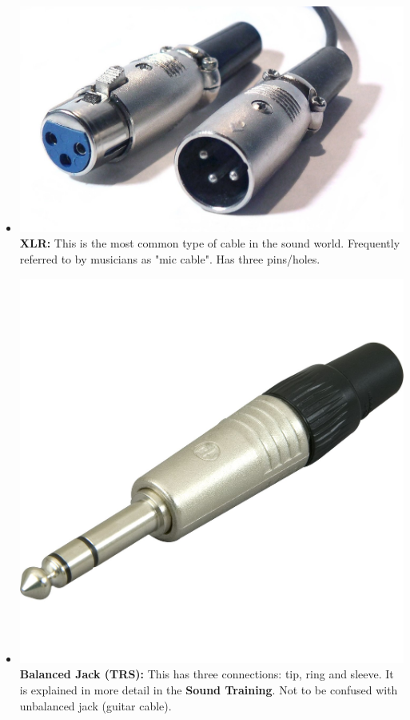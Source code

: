 \documentclass[14pt]{article} %
\begin{document}
\begin{itemize}

\item \includegraphics[scale=0.12]{xlr2.jpg}\textbf{XLR:} This is the most common type of cable in the sound world. Frequently referred to by musicians as "mic cable". Has three pins/holes.

\item \includegraphics[scale=0.35]{bal_jack.jpg}\textbf{Balanced Jack (TRS):} This has three connections: tip, ring and sleeve. It is explained in more detail in the \textbf{Sound Training}. Not to be confused with unbalanced jack (guitar cable).

\end{itemize}
\end{document}
